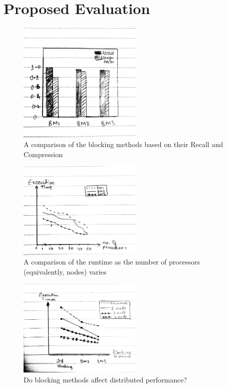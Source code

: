 \documentclass{article}
\begin{document}
\section{Proposed Evaluation} \label{proposed_eval}

\begin{figure}[htb!]
    \centering
    \includegraphics[width=0.53\textwidth]{BM-RecComp}
    \caption{A comparison of the blocking methods based on their Recall and Compression}
    \label{fig:reccomp}
\end{figure}

\begin{figure}[htb!]
    \centering
    \includegraphics[width=0.53\textwidth]{NumProcvsRuntime}
    \caption{A comparison of the runtime  as the number of processors (equivalently, nodes) varies}
    \label{fig:numproc}
\end{figure}

\begin{figure}[htb!]
    \centering
    \includegraphics[width=0.53\textwidth]{BMvsRuntime}
    \caption{Do blocking methods affect distributed performance?}
    \label{fig:bmruntime}
\end{figure}
\end{document}
